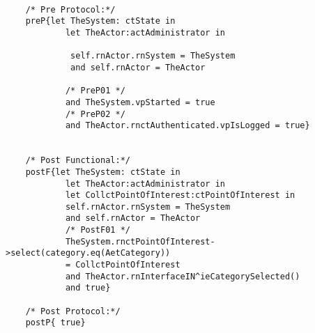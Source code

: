 	\scriptsize
	\vspace{0.5cm}
	\begin{lstlisting}[style=MessirStyle,firstnumber=auto,captionpos=b,caption={\msrmessir (MCL-oriented) specification of the operation \emph{oeSelectCategories}.},label=OM-actAdministrator-oeSelectCategories-MCL-LST]

	/* Pre Protocol:*/ 
	preP{let TheSystem: ctState in
	  		let TheActor:actAdministrator in
	  
	 		 self.rnActor.rnSystem = TheSystem
	 		 and self.rnActor = TheActor
	  
			/* PreP01 */
	  		and TheSystem.vpStarted = true
			/* PreP02 */
	  		and TheActor.rnctAuthenticated.vpIsLogged = true}
	
	
	/* Post Functional:*/ 
	postF{let TheSystem: ctState in
	  		let TheActor:actAdministrator in
	  		let CollctPointOfInterest:ctPointOfInterest in
	  		self.rnActor.rnSystem = TheSystem
	  		and self.rnActor = TheActor
			/* PostF01 */
	  		TheSystem.rnctPointOfInterest->select(category.eq(AetCategory))
	 		= CollctPointOfInterest
	 		and TheActor.rnInterfaceIN^ieCategorySelected()
	 		and true}
	
	/* Post Protocol:*/ 
	postP{ true}
	
	\end{lstlisting}
	\normalsize 
	
	
	
	





